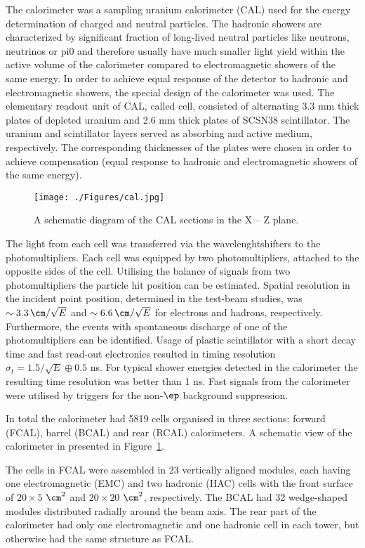 The \zeus calorimeter was a sampling uranium calorimeter (CAL) used for the energy determination of charged and neutral particles. 
The hadronic showers are characterized by significant fraction of long-lived neutral particles like neutrons, neutrinos or pi0 and therefore usually have much smaller light yield within the active volume of the calorimeter compared to electromagnetic showers of the same energy. In order to achieve equal response of the detector to hadronic and electromagnetic showers, the special design of the calorimeter was used. The elementary readout unit of CAL, called cell, consisted of alternating 3.3 mm thick plates of depleted uranium and 2.6 mm thick plates of SCSN38 scintillator. The uranium and scintillator layers served as absorbing and active medium, respectively. The corresponding thicknesses of the plates were chosen in order to achieve compensation (equal response to hadronic and electromagnetic showers of the same energy).

\begin{figure}[tpb]
	\centering
		\texttt{[image: ./Figures/cal.jpg]}
	\caption{A schematic diagram of the CAL sections in the X -- Z plane.}
	\label{fig:cal}
\end{figure}

The light from each cell was transferred via the wavelenghtshifters to the photomultipliers. Each cell was equipped by two photomultipliers, attached to the opposite sides of the cell. Utilising the balance of signals from two photomultipliers the particle hit position can be estimated. Spatial resolution in the incident point position, determined in the test-beam studies, was $\sim 3.3\,\cm/\sqrt{E}$ and $\sim 6.6\,\cm/\sqrt{E}$ for electrons and hadrons, respectively. Furthermore, the events with spontaneous discharge of one of the photomultipliers can be identified. Usage of plastic scintillator with a short decay time and fast read-out electronics resulted in timing resolution $\sigma_t = 1.5/\sqrt{E} \oplus 0.5$ ns. For typical shower energies detected in the calorimeter the resulting time resolution was better than 1 ns. Fast signals from the calorimeter were utilised by triggers for the non-$\ep$ background suppression. 

In total the calorimeter had 5819 cells organised in three sections: forward (FCAL), barrel (BCAL) and rear (RCAL) calorimeters. A schematic view of the calorimeter in presented in Figure~\ref{fig:cal}.

The cells in FCAL were assembled in 23 vertically aligned modules, each having one electromagnetic (EMC) and two hadronic (HAC) cells with the front surface of $20 \times 5$ $\cm^2$ and $20 \times 20$ $\cm^2$, respectively. The BCAL had 32 wedge-shaped modules distributed radially around the beam axis. The rear part of the calorimeter had only one electromagnetic and one hadronic cell in each tower, but otherwise had the same structure as FCAL.

